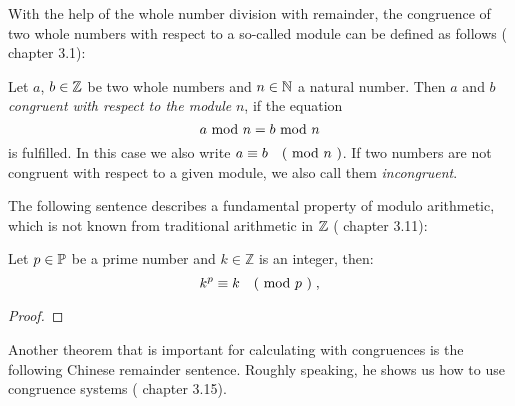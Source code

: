 With the help of the whole number division with remainder, the congruence of two whole numbers with respect to a so-called module can be defined as follows
(\cite{JB} chapter 3.1):
\begin{definition} [congruence] Let $ a $, $ b \in \mathbb{Z} $ be two whole numbers and $ n \in \mathbb{N} $ a natural number.
Then $ a $ and $ b $ \textit{congruent with respect to the module} $ n $, if the equation
\begin{equation}
a \text{ mod } n = b \text{ mod } n
\end{equation}
is fulfilled. In this case we also write
$ a \equiv b \quad \text{( mod } n \text{ )} $. If two numbers are not congruent with respect to a given module, we also call them \textit{incongruent}.
\end{definition}
The following sentence describes a fundamental property of modulo arithmetic, which is not known from traditional arithmetic in $ \mathbb{Z} $ (\cite{JB} chapter 3.11):
\begin{theorem}  Let $ p \in \mathbb{P} $ be a prime number
and $ k \in \mathbb{Z} $ is an integer, then:
\begin{equation}
k ^ p \equiv k \quad \text{( mod } p \text{ )} \;,
\end{equation}
\end{theorem}
\begin{proof} 
\end{proof}


Another theorem that is important for calculating with congruences is the following Chinese remainder sentence. Roughly speaking, he shows us how to use congruence systems (\cite{JB} chapter 3.15).

